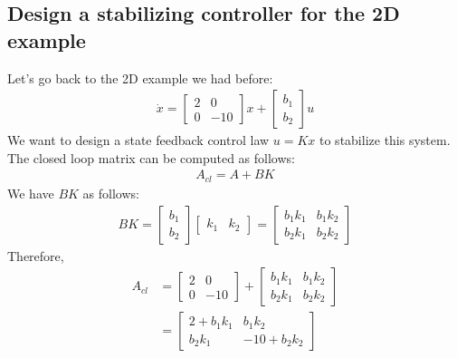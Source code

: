\documentclass{ee122_notes}
\begin{document}
\subsection{Design a stabilizing controller for the 2D example}
Let's go back to the 2D example we had before:
\begin{align*}
\dot{x} = \begin{bmatrix}
2 & 0\\
0 & -10
\end{bmatrix}x + \begin{bmatrix}
b_1 \\ b_2
\end{bmatrix}u
\end{align*}
We want to design a state feedback control law $u = Kx$ to stabilize this system. The closed loop matrix can be computed as follows:
\begin{align*}
A_{cl} = A + BK
\end{align*}
We have $BK$ as follows:
\begin{align*}
BK
=
\begin{bmatrix}
b_1 \\ b_2
\end{bmatrix}
\begin{bmatrix}
k_1 & k_2
\end{bmatrix}
=
\begin{bmatrix}
b_1k_1 & b_1k_2\\
b_2k_1 & b_2k_2
\end{bmatrix}
\end{align*}
Therefore,
\begin{align*}
A_{cl}
&=
\begin{bmatrix}
2 & 0\\
0 & -10
\end{bmatrix}
+
\begin{bmatrix}
b_1k_1 & b_1k_2\\
b_2k_1 & b_2k_2
\end{bmatrix}\\
&=
\begin{bmatrix}
2 + b_1k_1 & b_1k_2\\
b_2k_1 & -10 + b_2k_2
\end{bmatrix}
\end{align*}
\end{document}
